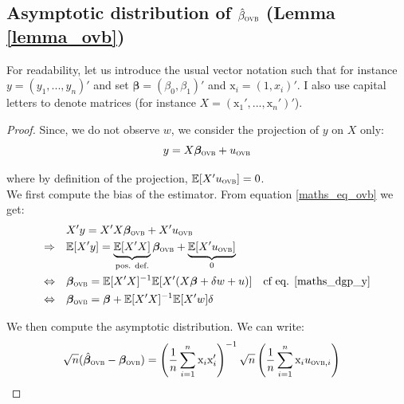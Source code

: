 \documentclass[usletter, 12pt]{article}
\begin{document}
\subsection{Asymptotic distribution of $\hat{\beta}_{\textsc{ovb}}$ (Lemma \ref{lemma_ovb})}
			
			For readability, let us introduce the usual vector notation such that for instance $y = (y_1, ..., y_n)'$ and set $\bm{\beta} = (\beta_0, \beta_1)'$ and $\text{x}_i = (1, x_i)'$. I also use capital letters to denote matrices (for instance $X = (\text{x}_{1}', ..., \text{x}_{n}')'$).
			
			\begin{proof} 
				Since, we do not observe $w$, we consider the projection of $y$ on $X$ only:
						~
						\begin{equation}\label{maths_eq_ovb}
							y = X\bm{\beta}_{\textsc{ovb}} + u_{\textsc{ovb}}
						\end{equation}
				
						where by definition of the projection, $\mathbb{E}[X'u_{\textsc{ovb}}] = 0$.\\
				
				We first compute the bias of the estimator. From equation  \ref{maths_eq_ovb} we get: 
				~
				\begin{equation}\label{bias_ovb}
					\begin{aligned}
            					& X'y = X'X\bm{\beta}_{\textsc{ovb}} + X'u_{\textsc{ovb}}\\
            					\Rightarrow \quad & \mathbb{E}[X'y] = \underbrace{\mathbb{E}[X'X]}_{\text{pos. def.}}\bm{\beta}_{\textsc{ovb}} + \underbrace{\mathbb{E}[X'u_{\textsc{ovb}}]}_{0} \\
            					\Leftrightarrow \quad & \bm{\beta}_{\textsc{ovb}} = \mathbb{E}[X'X]^{-1} \mathbb{E}[X'(X\bm{\beta} + \delta w + u)] & \text{cf eq. \ref{maths_dgp_y}}\\
            					\Leftrightarrow \quad & \bm{\beta}_{\textsc{ovb}} = \bm{\beta} + \mathbb{E}[X'X]^{-1} \mathbb{E}[X'w] \delta
					\end{aligned}
				\end{equation}		
				
				We then compute the asymptotic distribution. We can write: 
				~
				\begin{align*}
					\sqrt{n}(\hat{\bm{\beta}}_{\textsc{ovb}} - \bm{\beta}_{\textsc{ovb}}) &  = \left(\dfrac{1}{n} \sum_{i = 1}^{n} \text{x}_{i} \text{x}_{i}' \right)^{-1} \sqrt{n} \left(\dfrac{1}{n} \sum_{i = 1}^{n} \text{x}_{i} u_{\textsc{ovb}, i} \right)
				\end{align*}	
				

\end{proof}
\end{document}
